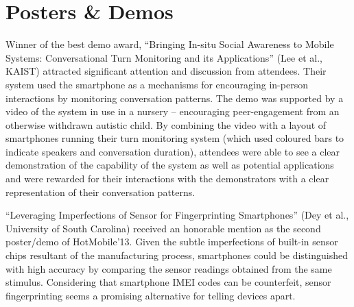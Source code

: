 \section{Posters \& Demos}
\label{sec:postersdemos}
Winner of the best demo award, ``Bringing In-situ Social Awareness to Mobile 
Systems: Conversational Turn Monitoring and its Applications'' (Lee et al., 
KAIST) attracted significant attention and discussion from attendees. Their 
system used the smartphone as a mechanisms for encouraging in-person interactions
by monitoring conversation patterns. The demo was supported by a video of the 
system in use in a nursery -- encouraging peer-engagement from an otherwise 
withdrawn autistic child. By combining the video with a layout of smartphones 
running their turn monitoring system (which used coloured bars to indicate 
speakers and conversation duration), attendees were able to see a clear 
demonstration of the capability of the system as well as potential applications
and were rewarded for their interactions with the demonstrators with a clear
representation of their conversation patterns.

``Leveraging Imperfections of Sensor for Fingerprinting Smartphones''
(Dey et al., University of South Carolina) received an honorable mention
as the second poster/demo of HotMobile'13. Given the subtle
imperfections of built-in sensor chips resultant of the manufacturing
process, smartphones could be distinguished with high accuracy by comparing
the sensor readings obtained from the same stimulus. Considering that
smartphone IMEI codes can be counterfeit, sensor fingerprinting seems
a promising alternative for telling devices apart.


